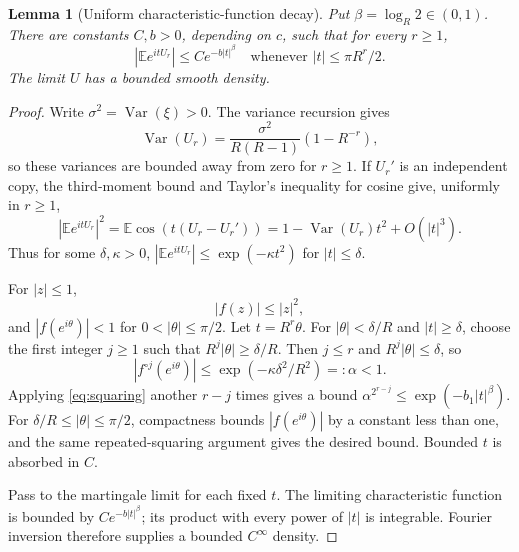 \documentclass[11pt,a4paper]{article}
\newtheorem{lemma}[theorem]{Lemma}
\theoremstyle{remark}\newtheorem{remark}[theorem]{Remark}
\newcommand{\E}{\mathbb E}\newcommand{\Pp}{\mathbb P}
\DeclareMathOperator{\Var}{Var}
\begin{document}
\begin{lemma}[Uniform characteristic-function decay]\label{lem:fourier}
Put $\beta=\log_R2\in(0,1)$. There are constants $C,b>0$, depending on $c$, such that for every $r\ge1$,
\begin{equation}\label{eq:cfbound}
\left|\E e^{itU_r}\right|\le C e^{-b|t|^\beta}
\quad\text{whenever } |t|\le\pi R^r/2.
\end{equation}
The limit $U$ has a bounded smooth density.
\end{lemma}
\begin{proof}
Write $\sigma^2=\Var(\xi)>0$. The variance recursion gives
\[
\Var(U_r)=\frac{\sigma^2}{R(R-1)}(1-R^{-r}),
\]
so these variances are bounded away from zero for $r\ge1$. If $U_r'$ is an independent copy, the third-moment bound and Taylor's inequality for cosine give, uniformly in $r\ge1$,
\[
|\E e^{itU_r}|^2
 =\E\cos(t(U_r-U_r'))
 =1-\Var(U_r)t^2+O(|t|^3).
\]
Thus for some $\delta,\kappa>0$,
$|\E e^{itU_r}|\le\exp(-\kappa t^2)$ for $|t|\le\delta$.

For $|z|\le1$,
\begin{equation}\label{eq:squaring}
|f(z)|\le |z|^2,
\end{equation}
and $|f(e^{i\theta})|<1$ for $0<|\theta|\le\pi/2$. Let $t=R^r\theta$. For $|\theta|<\delta/R$ and $|t|\ge\delta$, choose the first integer $j\ge1$ such that
$R^j|\theta|\ge\delta/R$. Then $j\le r$ and $R^j|\theta|\le\delta$, so
\[
|f^{\circ j}(e^{i\theta})|\le
\exp(-\kappa\delta^2/R^2)=:\alpha<1.
\]
Applying \eqref{eq:squaring} another $r-j$ times gives a bound
$\alpha^{2^{r-j}}\le\exp(-b_1|t|^\beta)$.
For $\delta/R\le|\theta|\le\pi/2$, compactness bounds
$|f(e^{i\theta})|$ by a constant less than one, and the same repeated-squaring argument gives the desired bound. Bounded $t$ is absorbed in $C$.

Pass to the martingale limit for each fixed $t$. The limiting characteristic function is bounded by $Ce^{-b|t|^\beta}$; its product with every power of $|t|$ is integrable. Fourier inversion therefore supplies a bounded $C^\infty$ density.
\end{proof}
\end{document}
